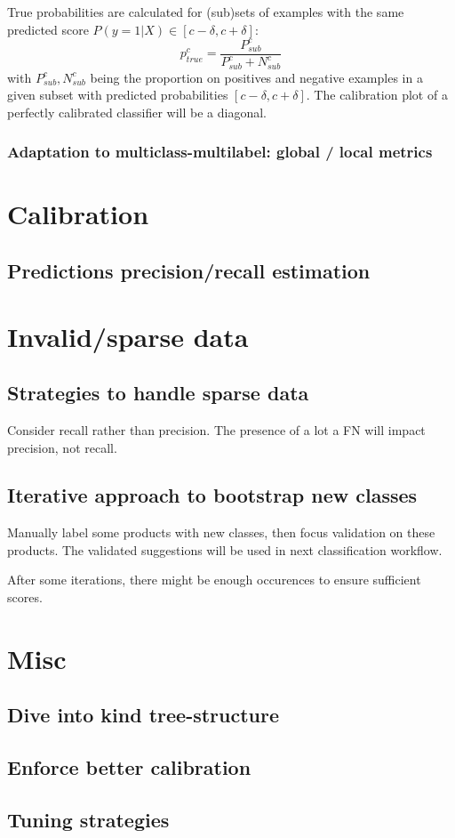 True probabilities are calculated for (sub)sets of examples with the same predicted score $P(y=1|X) \in [c-\delta, c+\delta]$: $$ p_{true}^c = \frac{P_{sub}^c}{P_{sub}^c + N_{sub}^c}$$ with $P_{sub}^c, N_{sub}^c$ being the proportion on positives and negative examples in a given subset with predicted probabilities $[c-\delta, c+\delta]$. The calibration plot of a perfectly calibrated classifier will be a diagonal.



\subsubsection{Adaptation to multiclass-multilabel: global / local metrics}


\pagebreak
\section{Calibration}

\subsection{Predictions precision/recall estimation}

\section{Invalid/sparse data}

\subsection{Strategies to handle sparse data}
Consider recall rather than precision. The presence of a lot a FN will impact precision, not recall.

\subsection{Iterative approach to bootstrap new classes}
Manually label some products with new classes, then focus validation on these products. The validated suggestions will be used in next classification workflow.

After some iterations, there might be enough occurences to ensure sufficient scores.


\section{Misc}

\subsection{Dive into kind tree-structure}
\subsection{Enforce better calibration}
\subsection{Tuning strategies}
